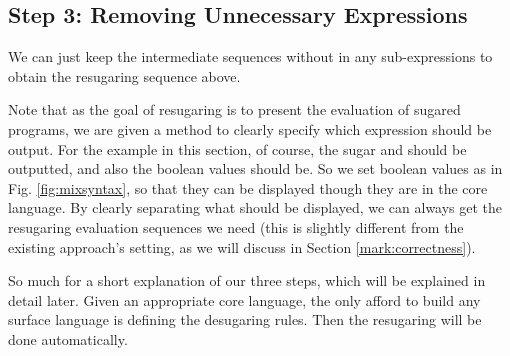 \subsection*{Step 3: Removing Unnecessary Expressions}
We can just keep the intermediate sequences without  in any sub-expressions to obtain the resugaring sequence above.



Note that as the goal of resugaring is to present the evaluation of sugared programs, we are given a method to clearly specify which expression should be output. For the example in this section, of course, the sugar  and  should be outputted, and also the boolean values should be. So we set boolean values as  in Fig. \ref{fig:mixsyntax}, so that they can be displayed though they are in the core language. By clearly separating what should be displayed, we can always get the resugaring evaluation sequences we need (this is slightly different from the existing approach's setting, as we will discuss in Section \ref{mark:correctness}).


\medskip

So much for a short explanation of our three steps, which will be explained in detail later. Given an appropriate core language, the only afford to build any surface language is defining the desugaring rules. Then the resugaring will be done automatically.
